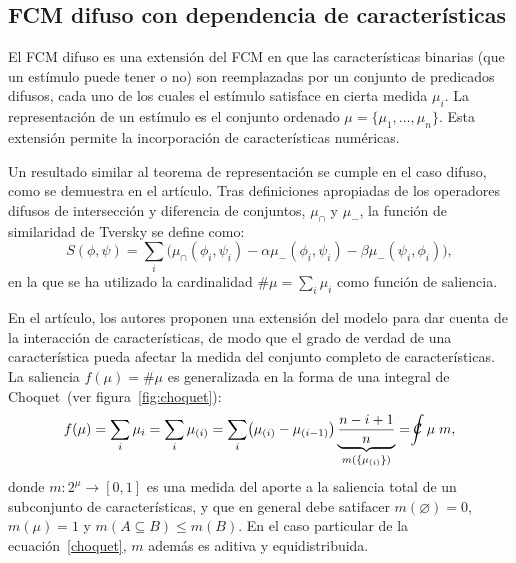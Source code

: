 \documentclass[spanish]{article}
\newcommand{\choquet}{\mathcal{C}\mspace{-18mu}\int}
\begin{document}
\subsection{FCM difuso con dependencia de características}
El FCM difuso es una extensión del FCM en que las características binarias (que un estímulo puede
tener o no) son reemplazadas por un conjunto de predicados difusos, cada uno de los cuales el
estímulo satisface en cierta medida $\mu_i$.  La representación de un estímulo es el conjunto
ordenado $\mu = \{\mu_1, \ldots, \mu_n\}$.  Esta extensión permite la incorporación de
características numéricas.

Un resultado similar al teorema de representación se cumple en el caso difuso, como se demuestra en
el artículo.  Tras definiciones apropiadas de los operadores difusos de intersección y diferencia de
conjuntos, $\mu_\cap$ y $\mu_-$, la función de similaridad de Tversky se define como:
\begin{equation}
    S(\phi, \psi) = \sum_i\bigl(\mu_\cap (\phi_i, \psi_i) -
                          \alpha\mu_-  (\phi_i, \psi_i)   -
                          \beta \mu_-  (\psi_i, \phi_i)\bigr),
\end{equation}
en la que se ha utilizado la cardinalidad $\#\mu = \sum_i\mu_i$ como función de saliencia.

En el artículo, los autores proponen una extensión del modelo para dar cuenta de la
interacción de características, de modo que el grado de verdad de una característica pueda afectar
la medida del conjunto completo de características.  La saliencia $f(\mu) = \#\mu$ es
generalizada en la forma de una integral de Choquet~(ver
figura~\ref{fig:choquet}):
\begin{equation}\label{choquet}
    f(\mu) = \sum_i\mu_i = \sum_i\mu_{(i)}
           = \sum_i \bigl(\mu_{(i)} - \mu_{(i-1)}\bigr)
             \underbrace{\frac{n-i+1}{n}}_{m(\{\mu_{(i)}\})}
           = \choquet \mu\;m,
\end{equation}
donde $m: 2^\mu\to{}[0, 1]$ es una medida del aporte a la saliencia total de un subconjunto de
características, y que en general debe satifacer
$m(\varnothing)=0$,
$m(\mu)=1$ y
$m(A\subseteq B)\leq m(B)$.  En el caso particular de la ecuación~\ref{choquet}, $m$ además es aditiva y
equidistribuida.
\end{document}
